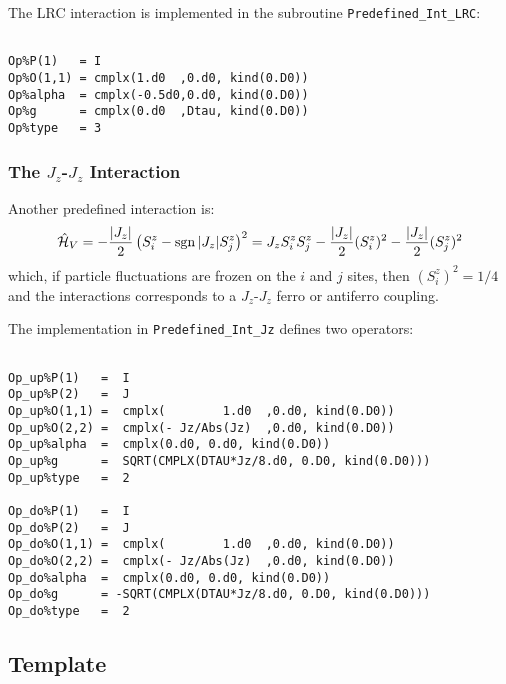 The LRC interaction is implemented in the subroutine \texttt{Predefined\_Int\_LRC}:
\begin{lstlisting}[style=fortran]

Op%P(1)   = I
Op%O(1,1) = cmplx(1.d0  ,0.d0, kind(0.D0))
Op%alpha  = cmplx(-0.5d0,0.d0, kind(0.D0))
Op%g      = cmplx(0.d0  ,Dtau, kind(0.D0)) 
Op%type   = 3

\end{lstlisting}


\subsubsection{The $J_z$-$J_z$ Interaction}

Another predefined interaction is:
\begin{align}
\hat{\mathcal{H}}_{V} =
- \frac{|J_z|}{2}  \left( S^{z}_i - \operatorname{sgn}|J_z| S^{z}_j \right)^2 =
J_z  S^{z}_i  S^{z}_j  - \frac{|J_z|}{2} (S^{z}_i)^2 - \frac{|J_z|}{2}(S^{z}_j)^2 
\end{align} 
which, if particle fluctuations are frozen on the $i$ and $j$ sites, then $(S^{z}_i)^2 = 1/4$ and the interactions corresponds to a $J_z$-$J_z$ ferro or antiferro coupling.

The implementation in \texttt{Predefined\_Int\_Jz} defines two operators:
\begin{lstlisting}[style=fortran]

Op_up%P(1)   =  I
Op_up%P(2)   =  J
Op_up%O(1,1) =  cmplx(        1.d0  ,0.d0, kind(0.D0))
Op_up%O(2,2) =  cmplx(- Jz/Abs(Jz)  ,0.d0, kind(0.D0))
Op_up%alpha  =  cmplx(0.d0, 0.d0, kind(0.D0))
Op_up%g      =  SQRT(CMPLX(DTAU*Jz/8.d0, 0.D0, kind(0.D0))) 
Op_up%type   =  2

Op_do%P(1)   =  I
Op_do%P(2)   =  J
Op_do%O(1,1) =  cmplx(        1.d0  ,0.d0, kind(0.D0))
Op_do%O(2,2) =  cmplx(- Jz/Abs(Jz)  ,0.d0, kind(0.D0))
Op_do%alpha  =  cmplx(0.d0, 0.d0, kind(0.D0))
Op_do%g      = -SQRT(CMPLX(DTAU*Jz/8.d0, 0.D0, kind(0.D0))) 
Op_do%type   =  2

\end{lstlisting}



\subsection{Template}

\\
	

